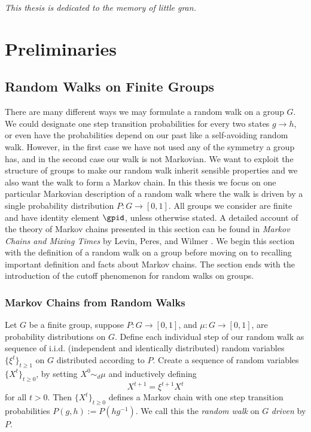 \documentclass[11pt]{report}
\begin{document}
\newpage \vspace*{8cm}
\thispagestyle{empty}

\emph{\Large This thesis is dedicated to the memory of little gran.}




\chapter{Preliminaries}
\label{chpt1:chpt}



\section{Random Walks on Finite Groups}



There are many different ways we may formulate a random walk on a group $G$. We could designate one step transition probabilities for every two states $g\to h$, or even have the probabilities depend on our past like a self-avoiding random walk. However, in the first case we have not used any of the symmetry a group has, and in the second case our walk is not Markovian. 
We want to exploit the structure of groups to make our random walk inherit sensible properties and we also want the walk to form a Markov chain. In this thesis we focus on one  particular Markovian description of a random walk where the walk is driven by a single probability distribution $P:G\to [0,1]$. All groups we consider are finite and have identity element $\gpid$, unless otherwise stated. A detailed account of the theory of Markov chains presented in this section can be found in \emph{Markov Chains and Mixing Times} by Levin, Peres, and Wilmer \cite{Levin2017}. We begin this section with the definition of a random walk on a group before moving on to recalling important definition and facts about Markov chains. The section ends with the introduction of the cutoff phenomenon for random walks on groups. 

\subsection{Markov Chains from Random Walks}











\begin{defn}
	Let $G$ be a finite group, suppose $P:G\to [0,1]$, and $\mu:G \to [0,1] $, are probability distributions on $G$. Define each individual step of our random walk as sequence of i.i.d. (independent and identically distributed) random 
	variables $\{\xi^{t}\}_{t\geq 1}$ on $G$ distributed according to $P$. Create a sequence of random variables 
	$\{X^{t}\}_{t\geq 	0}$, by setting $X^{0} \sim_{d} \mu$ and inductively defining
	\[X^{t+1} = \xi^{t+1} X^{t} \]
	for all $t>0$. Then $\{X^{t}\}_{t\geq 0}$ defines a Markov chain with one step transition probabilities $P(g,h) :=P(hg^{-1})$. We call this the \emph{random walk} on $G$ \emph{driven} by $P$.
\end{defn}
\end{document}
